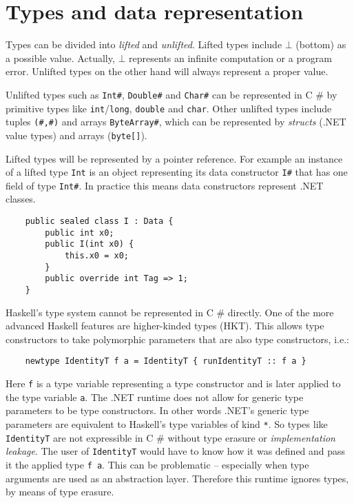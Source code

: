 \documentclass[en]{pracamgr}
\newcommand{\shrp}{%
  {\fontfamily{ppl}\selectfont\#%
  }}
\begin{document}
\section{Types and data representation}\label{s:data_rep}

Types can be divided into \textit{lifted} and \textit{unlifted}.
Lifted types include $\bot$ (bottom) as a possible value.
Actually, $\bot$ represents an infinite computation or
a program error. Unlifted types on the other hand will
always represent a proper value.

Unlifted types such as \texttt{Int\#}, \texttt{Double\#}
and \texttt{Char\#} can be represented in C\shrp{} by
primitive types like \texttt{int}/\texttt{long}, \texttt{double} and \texttt{char}.
Other unlifted types include tuples \texttt{(\#,\#)} and
arrays \texttt{ByteArray\#}, which can be represented by
\textit{structs} (.NET value types) and arrays (\texttt{byte[]}).

Lifted types will be represented by a pointer reference.
For example an instance of a lifted type \texttt{Int} is an object representing
its data constructor \texttt{I\#} that has one field of type \texttt{Int\#}.
In practice this means data constructors represent .NET classes.

\begin{verbatim}
    public sealed class I : Data {
        public int x0;
        public I(int x0) {
            this.x0 = x0;
        }
        public override int Tag => 1;
    }
\end{verbatim}

Haskell's type system cannot be represented in C\shrp{} directly.
One of the more advanced Haskell features are higher-kinded types (HKT).
This allows type constructors to take polymorphic parameters
that are also type constructors, i.e.:

\begin{verbatim}
    newtype IdentityT f a = IdentityT { runIdentityT :: f a }
\end{verbatim}

Here \texttt{f} is a type variable representing a type constructor
and is later applied to the type variable \texttt{a}.
The .NET runtime does not allow for generic type parameters to be
type constructors. In other words .NET's generic type parameters are
equivalent to Haskell's type variables of kind \texttt{*}.
So types like \texttt{IdentityT} are not
expressible in C\shrp{} without type erasure or \textit{implementation leakage}.
The user of \texttt{IdentityT} would have to know how it
was defined and pass it the applied type \texttt{f a}. This can be
problematic -- especially when type arguments are used as an abstraction layer.
Therefore this runtime ignores types, by
means of type erasure.
\end{document}
